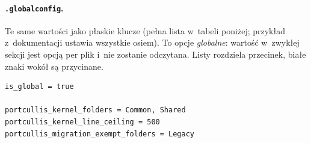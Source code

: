 \paragraph{\texttt{.globalconfig}.} Te same wartości jako płaskie klucze (pełna lista
w~tabeli poniżej; przykład z~dokumentacji ustawia wszystkie osiem). To opcje
\emph{globalne}: wartość w~zwykłej sekcji \repopath{[*.cs]} jest opcją per plik i~nie
zostanie odczytana. Listy rozdziela przecinek, białe znaki wokół są przycinane.

\begin{lstlisting}
is_global = true

portcullis_kernel_folders = Common, Shared
portcullis_kernel_line_ceiling = 500
portcullis_migration_exempt_folders = Legacy
\end{lstlisting}

